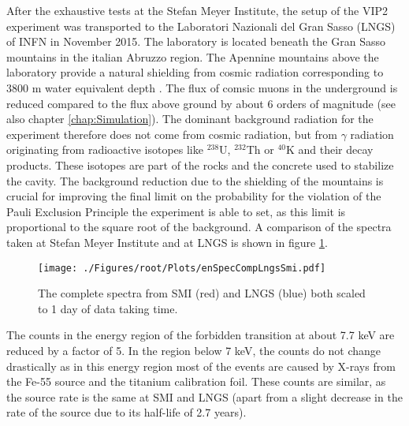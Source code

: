 After the exhaustive tests at the Stefan Meyer Institute, the setup of the VIP2 experiment was transported to the Laboratori Nazionali del Gran Sasso (LNGS) of INFN in November 2015. The laboratory is located beneath the Gran Sasso mountains in the italian Abruzzo region. The Apennine mountains above the laboratory provide a natural shielding from cosmic radiation corresponding to 3800 m water equivalent depth \cite{Bellini2013}. The flux of comsic muons in the underground is reduced compared to the flux above ground by about 6 orders of magnitude (see also chapter \ref{chap:Simulation}). The dominant background radiation for the experiment therefore does not come from cosmic radiation, but from $\gamma$ radiation originating from radioactive isotopes like $^{238}$U, $^{232}$Th or $^{40}$K and their decay products. These isotopes are part of the rocks and the concrete used to stabilize the cavity. The background reduction due to the shielding of the mountains is crucial for improving the final limit on the probability for the violation of the Pauli Exclusion Principle the experiment is able to set, as this limit is proportional to the square root of the background. A comparison of the spectra taken at Stefan Meyer Institute and at LNGS is shown in figure \ref{fig:enSpecSmiLngs}.
\begin{figure}[h]
 \centering
 \texttt{[image: ./Figures/root/Plots/enSpecCompLngsSmi.pdf]}
 \caption{The complete spectra from SMI (red) and LNGS (blue) both scaled to 1 day of data taking time.}
 \label{fig:enSpecSmiLngs}
\end{figure}
The counts in the energy region of the forbidden transition at about 7.7 keV are reduced by a factor of 5. In the region below 7 keV, the counts do not change drastically as in this energy region most of the events are caused by X-rays from the Fe-55 source and the titanium calibration foil. These counts are similar, as the source rate is the same at SMI and LNGS (apart from a slight decrease in the rate of the source due to its half-life of 2.7 years). 

